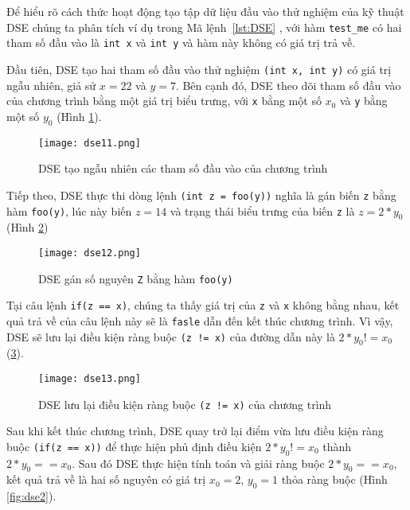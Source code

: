 Để hiểu rõ cách thức hoạt động tạo tập dữ liệu đầu vào thử nghiệm của kỹ thuật DSE chúng ta phân tích ví dụ trong Mã lệnh~\ref{lst:DSE} \cite{DSE}, với hàm \texttt{test\_me} có hai tham số đầu vào là \texttt{int x} và \texttt{int y} và hàm này không có giá trị trả về.

	

Đầu tiên, DSE tạo hai tham số đầu vào thử nghiệm \texttt{(int x, int y)} có giá trị ngẫu nhiên, giả sử $x = 22$ và $y = 7$. Bên cạnh đó, DSE theo dõi tham số đầu vào của chương trình bằng một giá trị biểu trưng, với \texttt{x} bằng một số $x_{0}$ và \texttt{y} bằng một số $y_{0}$ (Hình \ref{fig:dse11}).

\begin{figure}[H]
	\caption{DSE tạo ngẫu nhiên các tham số đầu vào của chương trình}
	\label{fig:dse11}
	\begin{center}
		\texttt{[image: dse11.png]}
	\end{center}	
\end{figure}

Tiếp theo, DSE thực thi dòng lệnh \texttt{(int z = foo(y))} nghĩa là gán  biến \texttt{z} bằng hàm \texttt{foo(y)}, lúc này biến $ z = 14 $ và trạng thái biểu trưng của biến \texttt{z} là $ z = 2*y_{0} $ (Hình \ref{fig:dse12})

\begin{figure}[H]
	\caption{DSE gán số nguyên \texttt{Z} bằng hàm \texttt{foo(y)}}
	\label{fig:dse12}
	\begin{center}
		\texttt{[image: dse12.png]}
	\end{center}	
\end{figure}

Tại câu lệnh \texttt{if(z == x)}, chúng ta thấy giá trị của \texttt{z} và \texttt{x} không bằng nhau, kết quả trả về của câu lệnh này sẽ là \texttt{fasle} dẫn đến kết thúc chương trình. Vì vậy, DSE sẽ lưu lại điều kiện ràng buộc \texttt{(z != x)} của đường dẫn này là $ 2*y_{0} != x_{0} $ (\ref{fig:dse13}).

\begin{figure}[H]
	\caption{DSE lưu lại điều kiện ràng buộc \texttt{(z != x)} của chương trình  }
	\label{fig:dse13}
	\begin{center}
		\texttt{[image: dse13.png]}
	\end{center}	
\end{figure}

Sau khi kết thúc chương trình, DSE quay trở lại điểm vừa lưu điều kiện ràng buộc \texttt{(if(z == x))} để thực hiện phủ định điều kiện $2*y_{0} != x_{0}$ thành $2*y_{0} == x_{0}$. Sau đó DSE thực hiện tính toán và giải ràng buộc $2*y_{0} == x_{0}$, kết quả trả về là hai số nguyên có giá trị $ x_{0} = 2$, $ y_{0} = 1 $ thỏa ràng buộc (Hình \ref{fig:dse2}).

